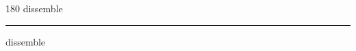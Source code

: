 
\begin{frame}
\begin{center}
\begin{turn}{180}
{\fontsize{2.5cm}{1em}\selectfont dissemble}
\end{turn}
\vspace{1em}\par  
\hrule
\vspace{1em}\par  
{\fontsize{2.5cm}{1em}\selectfont dissemble}
\end{center}
\end{frame}
